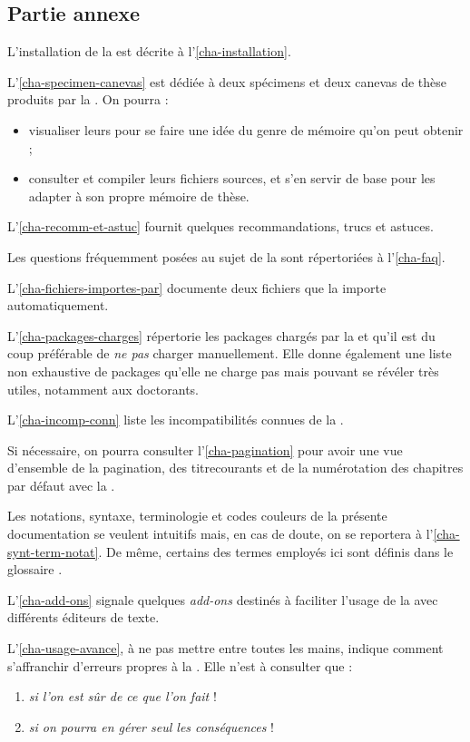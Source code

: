 \subsection{Partie annexe}
\label{sec-partie-annexe}

L'installation de la \yatCl{} est décrite à l'\vref{cha-installation}.

L'\vref{cha-specimen-canevas} est dédiée à deux spécimens et deux canevas de
thèse produits par la \yatCl{}. On pourra :
\begin{itemize}
\item visualiser leurs  pour se faire une idée du genre de
  mémoire qu'on peut obtenir ;
\item consulter et compiler leurs fichiers sources, et s'en servir de base pour
  les adapter à son propre mémoire de thèse.
\end{itemize}

L'\vref{cha-recomm-et-astuc} fournit quelques recommandations, trucs et astuces.

Les questions fréquemment posées au sujet de la \yatCl{} sont répertoriées
à l'\vref{cha-faq}.

L'\vref{cha-fichiers-importes-par} documente deux fichiers que la \yatCl{}
importe automatiquement.

L'\vref{cha-packages-charges} répertorie les packages chargés par la \yatCl{} et
qu'il est du coup préférable de \emph{ne pas} charger manuellement. Elle donne
également une liste non exhaustive de packages qu'elle ne charge pas mais
pouvant se révéler très utiles, notamment aux doctorants.

L'\vref{cha-incomp-conn} liste les incompatibilités connues de la \yatCl{}.

Si nécessaire, on pourra consulter l'\vref{cha-pagination} pour avoir une vue
d'ensemble de la \gls{pagination}, des \glspl{titrecourant} et de la
numérotation des chapitres par défaut avec la \yatCl{}.

Les notations, syntaxe, terminologie et codes couleurs de la présente
documentation se veulent intuitifs mais, en cas de doute, on se reportera
à l'\vref{cha-synt-term-notat}. De même, certains des termes employés ici sont
définis dans le glossaire .

L'\vref{cha-add-ons} signale quelques \emph{add-ons} destinés à faciliter
l'usage de la \yatCl{} avec différents éditeurs de texte.

L'\vref{cha-usage-avance}, à ne pas mettre entre toutes les mains, indique
comment s'affranchir d'erreurs propres à la \yatCl{}. Elle n'est
à consulter que :
\begin{enumerate}
\item \emph{si l'on est sûr de ce que l'on fait} !
\item \emph{si on pourra en gérer \emph{seul} les conséquences} !
\end{enumerate}

